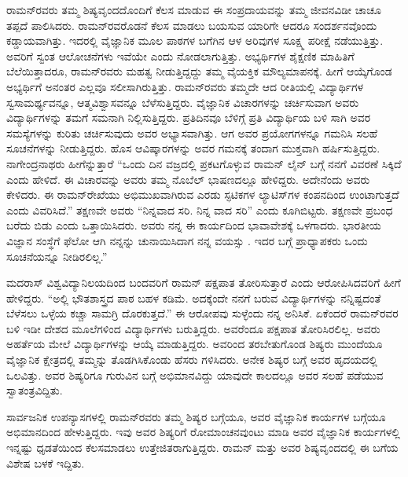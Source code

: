 ರಾಮನ್‍ರವರು ತಮ್ಮ ಶಿಷ್ಯವೃಂದದೊಂದಿಗೆ ಕೆಲಸ ಮಾಡುವ ಈ ಸಂಪ್ರದಾಯವನ್ನು ತಮ್ಮ ಜೀವನವಿಡೀ ಚಾಚೂ ತಪ್ಪದೆ ಪಾಲಿಸಿದರು. ರಾಮನ್‍ರವರೊಡನೆ ಕೆಲಸ ಮಾಡಲು ಬಯಸುವ ಯಾರಿಗೇ ಆದರೂ ಸಂದರ್ಶನವೊಂದು ಕಡ್ಡಾಯವಾಗಿತ್ತು. ಇದರಲ್ಲಿ ವೈಜ್ಞಾನಿಕ ಮೂಲ ಪಾಠಗಳ ಬಗೆಗಿನ ಆಳ ಅರಿವುಗಳ ಸೂಕ್ಷ್ಮ ಪರೀಕ್ಷೆ ನಡೆಯುತ್ತಿತ್ತು. ಅವರಿಗೆ ಸ್ವಂತ ಆಲೋಚನೆಗಳು ಇವೆಯೇ ಎಂದು ನೋಡಲಾಗುತ್ತಿತ್ತು. ಅಭ್ಯರ್ಥಿಗಳ ಶೈಕ್ಷಣಿಕ ಮಾಹಿತಿಗೆ ಬೆಲೆಯಿತ್ತಾದರೂ, ರಾಮನ್‍ರವರು ಮಹತ್ವ ನೀಡುತ್ತಿದ್ದದ್ದು ತಮ್ಮ ವೈಯಕ್ತಿಕ ಮೌಲ್ಯಮಾಪನಕ್ಕೆ. ಹೀಗೆ ಆಯ್ಕೆಗೊಂಡ ಅಭ್ಯರ್ಥಿಗೆ ಅನಂತರ ಎಲ್ಲವೂ ಸಲೀಸಾಗಿರುತ್ತಿತ್ತು. ರಾಮನ್‍ರವರು ತಮ್ಮದೇ ಆದ ರೀತಿಯಲ್ಲಿ ವಿದ್ಯಾರ್ಥಿಗಳ ಸ್ವಸಾಮರ್ಥ್ಯವನ್ನೂ, ಆತ್ಮವಿಶ್ವಾಸವನ್ನೂ ಬೆಳೆಸುತ್ತಿದ್ದರು. ವೈಜ್ಞಾನಿಕ ವಿಚಾರಗಳನ್ನು ಚರ್ಚಿಸುವಾಗ ಅವರು ವಿದ್ಯಾರ್ಥಿಗಳನ್ನು ತಮಗೆ ಸಮನಾಗಿ ನಿಲ್ಲಿಸುತ್ತಿದ್ದರು. ಪ್ರತಿದಿನವೂ ಬೆಳಿಗ್ಗೆ ಪ್ರತಿ ವಿದ್ಯಾರ್ಥಿಯ ಬಳಿ ಸಾಗಿ ಅವರ ಸಮಸ್ಯೆಗಳನ್ನು ಕುರಿತು ಚರ್ಚಿಸುವುದು ಅವರ ಅಭ್ಯಾಸವಾಗಿತ್ತು. ಆಗ ಅವರ ಪ್ರಯೋಗಗಳನ್ನೂ ಗಮನಿಸಿ ಸಲಹೆ ಸೂಚನೆಗಳನ್ನು ನೀಡುತ್ತಿದ್ದರು. ಹೊಸ ಆವಿಷ್ಕಾರಗಳನ್ನು ಅವರ ಗಮನಕ್ಕೆ ತಂದಾಗ ಮುಕ್ತವಾಗಿ ಹರ್ಷಿಸುತ್ತಿದ್ದರು. ನಾಗೇಂದ್ರನಾಥರು ಹೀಗೆನ್ನುತ್ತಾರೆ\enginline{--} “ಒಂದು ದಿನ ವಜ್ರದಲ್ಲಿ ಪ್ರಕಟಗೊಳ್ಳುವ ರಾಮನ್ ಲೈನ್ ಬಗ್ಗೆ ನನಗೆ ವಿವರಣೆ ಸಿಕ್ಕಿದೆ ಎಂದು ಹೇಳಿದೆ. ಈ ವಿಚಾರವನ್ನು ಅವರು ತಮ್ಮ ನೊಬೆಲ್ ಭಾಷಣದಲ್ಲೂ ಹೇಳಿದ್ದರು. ಅದೇನೆಂದು ಅವರು ಕೇಳಿದರು. ಈ ರಾಮನ್‌ರೇಖೆಯು ಅಭಿಮುಖವಾಗಿರುವ ಎರಡು ಸ್ಫಟಿಕಗಳ ಲ್ಯಾಟಿಸ್‌ಗಳ ಕಂಪನದಿಂದ ಉಂಟಾಗುತ್ತದೆ ಎಂದು ವಿವರಿಸಿದೆ.” ತಕ್ಷಣವೇ ಅವರು “ನಿನ್ನವಾದ ಸರಿ. ನಿನ್ನ ವಾದ ಸರಿ” ಎಂದು ಕೂಗಿಬಿಟ್ಟರು. ತಕ್ಷಣವೇ ಪ್ರಬಂಧ ಬರೆದು ಬಿಡು ಎಂದು ಒತ್ತಾಯಿಸಿದರು. ಅವರು ನನ್ನ ಈ ಕಾರ್ಯದಿಂದ ಭಾವಾವೇಶಕ್ಕೆ ಒಳಗಾದರು. ಭಾರತೀಯ ವಿಜ್ಞಾನ ಸಂಸ್ಥೆಗೆ ಫೆಲೋ ಆಗಿ ನನ್ನನ್ನು ಚುನಾಯಿಸಿದಾಗ ನನ್ನ ವಯಸ್ಸು . ಇದರ ಬಗ್ಗೆ ಪ್ರಾಧ್ಯಾಪಕರು ಒಂದು ಸೂಚನೆಯನ್ನೂ ನೀಡಿರಲಿಲ್ಲ.”

ಮದರಾಸ್ ವಿಶ್ವವಿದ್ಯಾನಿಲಯದಿಂದ ಬಂದವರಿಗೆ ರಾಮನ್ ಪಕ್ಷಪಾತ ತೋರಿಸುತ್ತಾರೆ ಎಂದು ಆರೋಪಿಸಿದವರಿಗೆ ಹೀಗೆ ಹೇಳಿದ್ದರು.\enginline{--} “ಅಲ್ಲಿ ಭೌತಶಾಸ್ತ್ರದ ಪಾಠ ಬಹಳ ಕಡಿಮೆ. ಅದಕ್ಕೆಂದೇ ನನಗೆ ಬರುವ ವಿದ್ಯಾರ್ಥಿಗಳನ್ನು ನನ್ನಿಷ್ಟದಂತೆ ಬೆಳೆಸಲು ಒಳ್ಳೆಯ ಕಚ್ಚಾ ಸಾಮಗ್ರಿ ದೊರಕುತ್ತದೆ.” ಈ ಆರೋಪವು ಸುಳ್ಳೆಂದು ನನ್ನ ಅನಿಸಿಕೆ. ಏಕೆಂದರೆ ರಾಮನ್‍ರವರ ಬಳಿ ಇಡೀ ದೇಶದ ಮೂಲೆಗಳಿಂದ ವಿದ್ಯಾರ್ಥಿಗಳು ಬರುತ್ತಿದ್ದರು. ಅವರೆಂದೂ ಪಕ್ಷಪಾತ ತೋರಿಸಿರಲಿಲ್ಲ. ಅವರು ಅಹರ್ತೆಯ ಮೇಲೆ ವಿದ್ಯಾರ್ಥಿಗಳನ್ನು ಆಯ್ಕೆ ಮಾಡುತ್ತಿದ್ದರು. ಅವರಿಂದ ತರಬೇತುಗೊಂಡ ಶಿಷ್ಯರು ಮುಂದೆಯೂ ವೈಜ್ಞಾನಿಕ ಕ್ಷೇತ್ರದಲ್ಲಿ ತಮ್ಮನ್ನು ತೊಡಗಿಸಿಕೊಂಡು ಹೆಸರು ಗಳಿಸಿದರು. ಅನೇಕ ಶಿಷ್ಯರ ಬಗ್ಗೆ ಅವರ ಹೃದಯದಲ್ಲಿ ಒಲವಿತ್ತು. ಅವರ ಶಿಷ್ಯರಿಗೂ ಗುರುವಿನ ಬಗ್ಗೆ ಅಭಿಮಾನವಿದ್ದು ಯಾವುದೇ ಕಾಲದಲ್ಲೂ ಅವರ ಸಲಹೆ ಪಡೆಯುವ ಸ್ವಾತಂತ್ರವಿದ್ದಿತು.

ಸಾರ್ವಜನಿಕ ಉಪನ್ಯಾಸಗಳಲ್ಲಿ ರಾಮನ್‍ರವರು ತಮ್ಮ ಶಿಷ್ಯರ ಬಗ್ಗೆಯೂ, ಅವರ ವೈಜ್ಞಾನಿಕ ಕಾರ್ಯಗಳ ಬಗ್ಗೆಯೂ ಅಭಿಮಾನದಿಂದ ಹೇಳುತ್ತಿದ್ದರು. ಇವು ಅವರ ಶಿಷ್ಯರಿಗೆ ರೋಮಾಂಚನ\-ವುಂಟು ಮಾಡಿ ಅವರ ವೈಜ್ಞಾನಿಕ ಕಾರ್ಯಗಳಲ್ಲಿ ಇನ್ನಷ್ಟು ಧೃಡತೆಯಿಂದ ಕೆಲಸಮಾಡಲು ಉತ್ತೇಜಿತ\-ರಾಗುತ್ತಿದ್ದರು. ರಾಮನ್ ಮತ್ತು ಅವರ ಶಿಷ್ಯವೃಂದದಲ್ಲಿ ಈ ಬಗೆಯ ವಿಶೇಷ ಬಳಕೆ ಇದ್ದಿತು.




